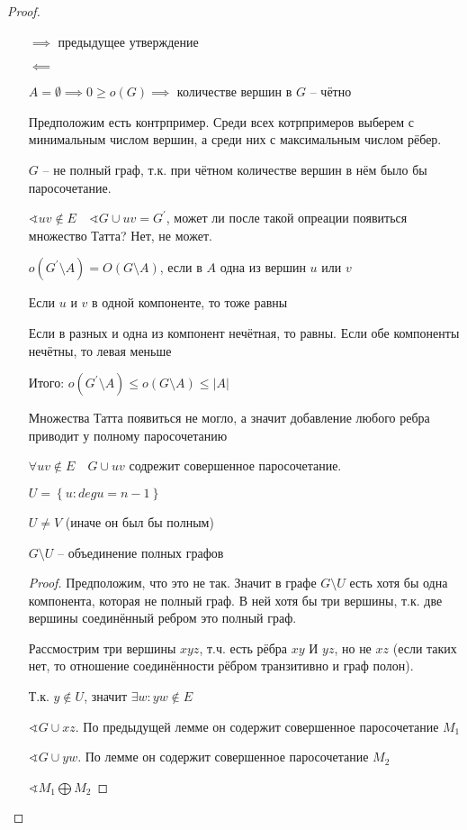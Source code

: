 \documentclass{book}
\renewcommand\O{\ensuremath{\emptyset}}
\newcommand{\p}[1]{#1^{\prime}}
\theoremstyle{definition}
\begin{document}
\begin{proof}
   \begin{itemize}
       \item []
       \item [$\implies $] предыдущее утверждение
       \item [$\impliedby $]

           $A = \O  \implies  0\geqslant o(G) \implies $ количестве вершин в $G$ -- чётно 

           Предположим есть контрпример. Среди всех котрпримеров выберем с минимальным числом вершин, а среди них с максимальным числом рёбер.

           $G$ -- не полный граф, т.к. при чётном количестве вершин в нём было бы паросочетание.

            $\sphericalangle uv\not\in E\quad \sphericalangle G\cup uv = \p G$, может ли после такой опреации появиться множество Татта? Нет, не может.

            $o\left( \p G\setminus  A \right) = O(G\setminus A)$, если в $A$ одна из вершин  $u$ или $v$

             Если $u$ и $v$  в одной компоненте, то тоже равны

             Если в разных и одна из компонент нечётная, то равны. Если обе компоненты нечётны, то левая меньше

             Итого: $o\left( \p G\setminus A \right) \leqslant o\left( G \setminus  A \right) \leqslant |A|$

             Множества Татта появиться не могло, а значит добавление любого ребра приводит у полному паросочетанию

             $\forall uv\not\in E\quad G\cup uv$ содрежит совершенное паросочетание.

            $U = \left\{ u: deg u = n-1 \right\} $

            $U \neq  V$ (иначе он был бы полным)

             \begin{lemma}
                 $G\setminus U$ -- объединение полных графов
             \end{lemma}
             \begin{proof}
                 Предположим, что это не так. Значит в графе $G\setminus U$ есть хотя бы одна компонента, которая не полный граф. В ней хотя бы три вершины, т.к. две вершины соединённый ребром это полный граф.

                 Рассмострим три вершины $xyz$, т.ч.  есть рёбра  $xy$ И  $yz$, но не  $xz$ (если таких нет, то отношение соединённости рёбром транзитивно и граф полон).

                 Т.к.  $y\not\in U$, значит $\exists w: yw\not\in E$

                 $\sphericalangle G\cup xz$. По предыдущей лемме он содержит совершенное паросочетание $M_1$

               $\sphericalangle G\cup yw$. По лемме он содержит совершенное паросочетание $M_2$

               $\sphericalangle M_1 \bigoplus M_2$
             \end{proof}
   \end{itemize}
\end{proof}
\end{document}
